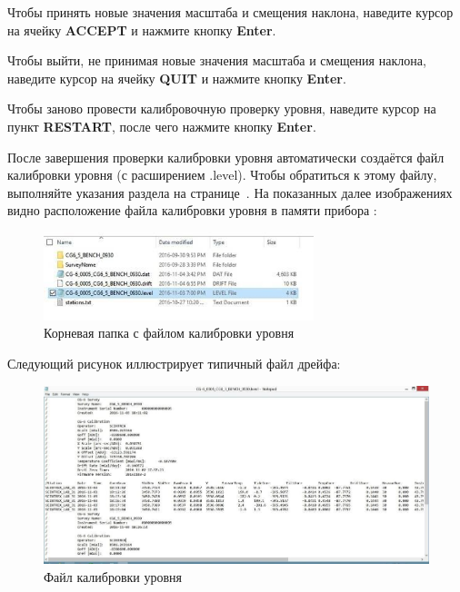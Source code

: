 Чтобы принять новые значения масштаба и смещения наклона, наведите курсор на
ячейку \textbf{ACCEPT} и нажмите кнопку \textbf{Enter}.

Чтобы выйти, не принимая новые значения масштаба и смещения наклона,
наведите курсор на ячейку \textbf{QUIT} и нажмите кнопку \textbf{Enter}.

Чтобы заново провести калибровочную проверку уровня, наведите курсор на пункт
\textbf{RESTART}, после чего нажмите кнопку \textbf{Enter}.

После завершения проверки калибровки уровня автоматически создаётся файл
калибровки уровня (с расширением .level). Чтобы обратиться к этому файлу,
выполняйте указания раздела  на
странице~\pageref{subsec:taking_a_measurement}. На показанных далее изображениях
видно расположение файла калибровки уровня в памяти прибора \cg{}:

\begin{figure}[H]
  \centering
  \includegraphics[width=0.7\textwidth]{figures/the_level_calibration_file_under_root_folder}
  \caption{Корневая папка с файлом калибровки уровня}
  \label{fig:the_level_calibration_file_under_root_folder}
\end{figure}

Следующий рисунок иллюстрирует типичный файл дрейфа:

\begin{figure}[H]
  \centering
  \includegraphics[width=\textwidth]{figures/the_level_calibration_file}
  \caption{Файл калибровки уровня}
  \label{fig:the_level_calibration_file}
\end{figure}

